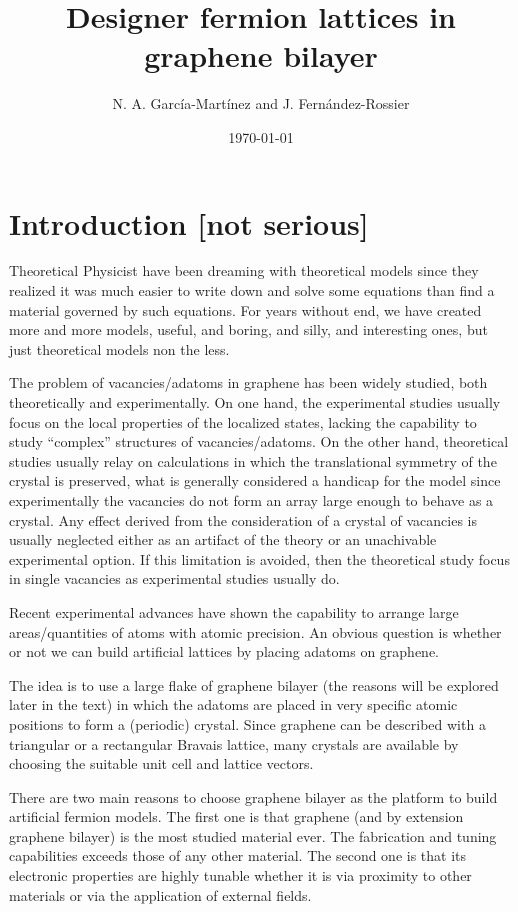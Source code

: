 \documentclass[a4paper]{article}
\title{\vspace{-2.5cm}
Designer fermion lattices in graphene bilayer}
\author{N. A. García-Martínez and J. Fernández-Rossier}
\date{\today}
\begin{document}
\maketitle

\tableofcontents
\newpage
\section{Introduction [not serious]}
Theoretical Physicist have been dreaming with theoretical models since they realized it was much easier to write down and solve some equations than find a material governed by such equations. For years without end, we have created more and more models, useful, and boring, and silly, and interesting ones, but just theoretical models non the less.

The problem of vacancies/adatoms in graphene has been widely studied, both theoretically and experimentally. On one hand, the experimental studies usually focus on the local properties of the localized states, lacking the capability to study ``complex'' structures of vacancies/adatoms. On the other hand, theoretical studies usually relay on calculations in which the translational symmetry of the crystal is preserved, what is generally considered a handicap for the model since experimentally the vacancies do not form an array large enough to behave as a crystal. Any effect derived from the consideration of a crystal of vacancies is usually neglected either as an artifact of the theory or an unachivable experimental option. If this limitation is avoided, then the theoretical study focus in single vacancies as experimental studies usually do.

Recent experimental advances have shown the capability to arrange large areas/quantities of atoms with atomic precision\cite{Brihuega2016,Kalff2016}.
An obvious question is whether or not we can build artificial lattices by placing adatoms on graphene.

The idea is to use a large flake of graphene bilayer (the reasons will be explored later in the text) in which the adatoms are placed in very specific atomic positions to form a (periodic) crystal. Since graphene can be described with a triangular or a rectangular Bravais lattice, many crystals are available by choosing the suitable unit cell and lattice vectors.


There are two main reasons to choose graphene bilayer as the platform to build artificial fermion models. The first one is that graphene (and by extension graphene bilayer) is the most studied material ever. The fabrication and tuning capabilities exceeds those of any other material. The second one is that its electronic properties are highly tunable whether it is via proximity to other materials or via the application of external fields.
\end{document}
